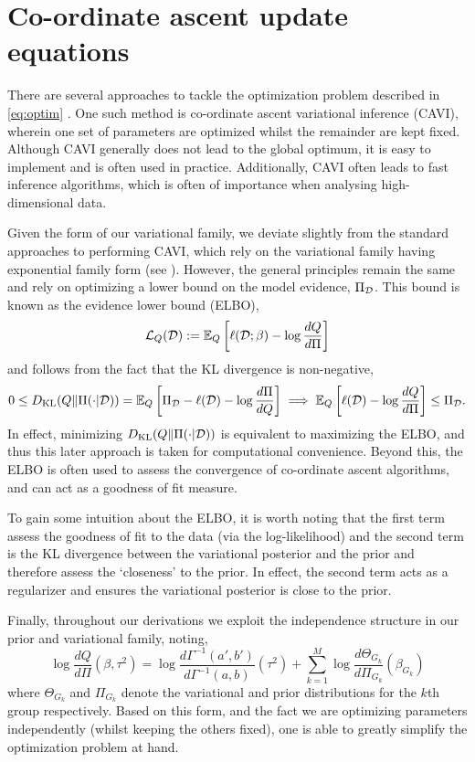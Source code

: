 \newpage
\section{Co-ordinate ascent update equations}

There are several approaches to tackle the optimization problem described in \eqref{eq:optim} \citep{Zhang2019a}. One such method is co-ordinate ascent variational inference (CAVI), wherein one set of parameters are optimized whilst the remainder are kept fixed. Although CAVI generally does not lead to the global optimum, it is easy to implement and is often used in practice. Additionally, CAVI often leads to fast inference algorithms, which is often of importance when analysing high-dimensional data.

Given the form of our variational family, we deviate slightly from the standard approaches to performing CAVI, which rely on the variational family having exponential family form (see \cite[Chp. 10]{Bishop06}). However, the general principles remain the same and rely on optimizing a lower bound on the model evidence, $\Pi_{\mathcal{D}}$. This bound is known as the evidence lower bound (ELBO),
\begin{equation}
   \mathcal{L}_Q(\mathcal{D}) := \mathbb{E}_Q \left[ \ell(\mathcal{D}; \beta) - \log \frac{dQ}{d\Pi} \right]
\end{equation} 
and follows from the fact that the KL divergence is non-negative,
\begin{equation*}
    0 \leq 
    D_\text{KL}(Q \| \Pi(\cdot | \mathcal{D})) = \mathbb{E}_Q \left[ 
	\Pi_{\mathcal{D}} - \ell(\mathcal{D}) - 
	\log \frac{d\Pi}{dQ}
    \right]
    \implies
    \mathbb{E}_Q \left[ 
	\ell(\mathcal{D}) -
	\log \frac{dQ}{d\Pi}
    \right] \leq \Pi_{\mathcal{D}}.
\end{equation*}
In effect, minimizing $D_\text{KL}(Q \| \Pi(\cdot | \mathcal{D})) $ is equivalent to maximizing the ELBO, and thus this later approach is taken for computational convenience. Beyond this, the ELBO is often used to assess the convergence of co-ordinate ascent algorithms, and can act as a goodness of fit measure. 

To gain some intuition about the ELBO, it is worth noting that the first term assess the goodness of fit to the data (via the log-likelihood) and the second term is the KL divergence between the variational posterior and the prior and therefore assess the `closeness' to the prior. In effect, the second term acts as a regularizer and ensures the variational posterior is close to the prior.

Finally, throughout our derivations we exploit the independence structure in our prior and variational family, noting,
\begin{equation}
    \log \frac{dQ}{d\Pi}(\beta, \tau^2) = 
	\log \frac{d\Gamma^{-1}(a', b')}{d \Gamma^{-1}(a, b)}(\tau^2) +
	\sum_{k=1}^{M} \log \frac{d\Theta_{G_k}}{d\Pi_{G_k}} (\beta_{G_k}) 
\end{equation}
where $\Theta_{G_k}$ and $\Pi_{G_k}$ denote the variational and prior distributions for the $k$th group respectively. Based on this form, and the fact we are optimizing parameters independently (whilst keeping the others fixed), one is able to greatly simplify the optimization problem at hand.


